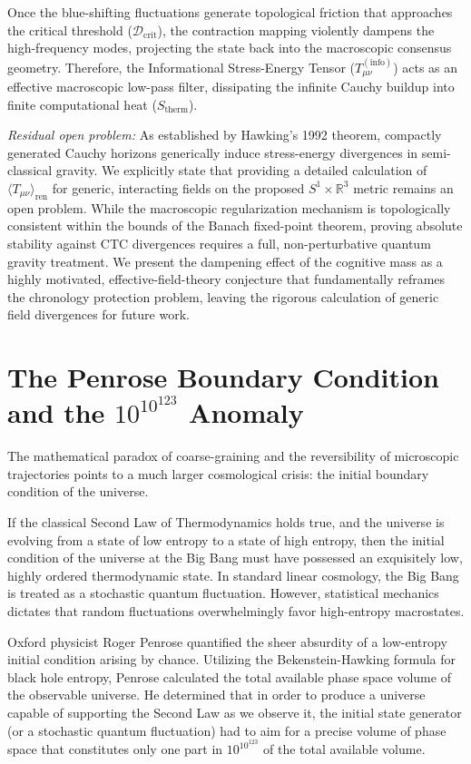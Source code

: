 \documentclass[12pt,openany]{book}
\theoremstyle{plain}
\theoremstyle{definition}
\theoremstyle{remark}
\begin{document}
Once the blue-shifting fluctuations generate topological friction that approaches the critical threshold ($\mathcal{D}_{\text{crit}}$), the contraction mapping violently dampens the high-frequency modes, projecting the state back into the macroscopic consensus geometry. Therefore, the Informational Stress-Energy Tensor ($T_{\mu\nu}^{(\text{info})}$) acts as an effective macroscopic low-pass filter, dissipating the infinite Cauchy buildup into finite computational heat ($S_{\text{therm}}$).

\textit{Residual open problem:} As established by Hawking's 1992 theorem, compactly generated Cauchy horizons generically induce stress-energy divergences in semi-classical gravity. We explicitly state that providing a detailed calculation of $\langle T_{\mu\nu} \rangle_{\text{ren}}$ for generic, interacting fields on the proposed $S^1 \times \mathbb{R}^3$ metric remains an open problem. While the macroscopic regularization mechanism is topologically consistent within the bounds of the Banach fixed-point theorem, proving absolute stability against CTC divergences requires a full, non-perturbative quantum gravity treatment. We present the dampening effect of the cognitive mass as a highly motivated, effective-field-theory conjecture that fundamentally reframes the chronology protection problem, leaving the rigorous calculation of generic field divergences for future work.

\section{The Penrose Boundary Condition and the $10^{10^{123}}$ Anomaly}

The mathematical paradox of coarse-graining and the reversibility of microscopic trajectories points to a much larger cosmological crisis: the initial boundary condition of the universe.

If the classical Second Law of Thermodynamics holds true, and the universe is evolving from a state of low entropy to a state of high entropy, then the initial condition of the universe at the Big Bang must have possessed an exquisitely low, highly ordered thermodynamic state. In standard linear cosmology, the Big Bang is treated as a stochastic quantum fluctuation. However, statistical mechanics dictates that random fluctuations overwhelmingly favor high-entropy macrostates. 

Oxford physicist Roger Penrose quantified the sheer absurdity of a low-entropy initial condition arising by chance. Utilizing the Bekenstein-Hawking formula for black hole entropy, Penrose calculated the total available phase space volume of the observable universe. He determined that in order to produce a universe capable of supporting the Second Law as we observe it, the initial state generator (or a stochastic quantum fluctuation) had to aim for a precise volume of phase space that constitutes only one part in $10^{10^{123}}$ of the total available volume.
\end{document}
